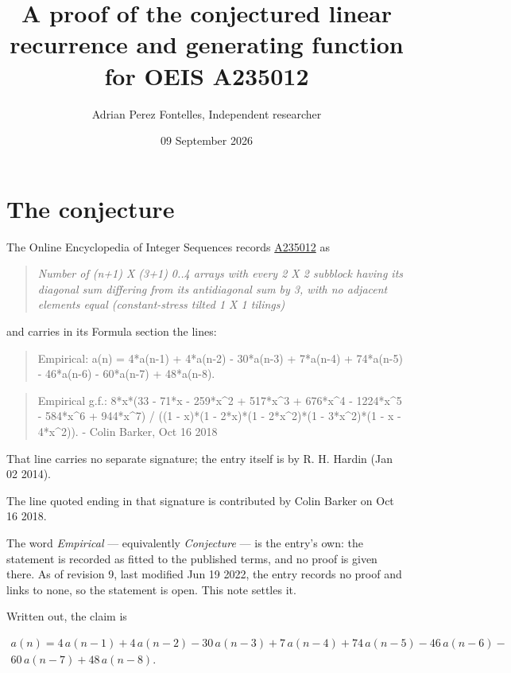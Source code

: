 \documentclass[11pt]{article}
\title{A proof of the conjectured linear recurrence and generating function for OEIS A235012}
\author{Adrian Perez Fontelles, Independent researcher}
\date{09 September 2026}
\theoremstyle{definition}
\begin{document}
\maketitle
\section{The conjecture}

The Online Encyclopedia of Integer Sequences records \href{https://oeis.org/A235012}{A235012} as

\begin{quote}\itshape Number of (n+1) X (3+1) 0..4 arrays with every 2 X 2 subblock having its diagonal sum differing from its antidiagonal sum by 3, with no adjacent elements equal (constant-stress tilted 1 X 1 tilings)\end{quote}

and carries in its Formula section the lines:

\begin{quote}\ttfamily Empirical: a(n) = 4*a(n-1) + 4*a(n-2) - 30*a(n-3) + 7*a(n-4) + 74*a(n-5) - 46*a(n-6) - 60*a(n-7) + 48*a(n-8).\end{quote}

\begin{quote}\ttfamily Empirical g.f.: 8*x*(33 - 71*x - 259*x\textasciicircum{}2 + 517*x\textasciicircum{}3 + 676*x\textasciicircum{}4 - 1224*x\textasciicircum{}5 - 584*x\textasciicircum{}6 + 944*x\textasciicircum{}7) / ((1 - x)*(1 - 2*x)*(1 - 2*x\textasciicircum{}2)*(1 - 3*x\textasciicircum{}2)*(1 - x - 4*x\textasciicircum{}2)). - Colin Barker, Oct 16 2018\end{quote}

That line carries no separate signature; the entry itself is by R. H. Hardin (Jan 02 2014).

The line quoted ending in that signature is contributed by Colin Barker on Oct 16 2018.

The word {\itshape Empirical} --- equivalently {\itshape Conjecture} --- is the entry's own: the statement is recorded as fitted to the published terms, and no proof is given there. As of revision 9, last modified Jun 19 2022, the entry records no proof and links to none, so the statement is open. This note settles it.

Written out, the claim is

\begin{multline*} a(n) = 4\,a(n-1) + 4\,a(n-2) - 30\,a(n-3) + 7\,a(n-4) + 74\,a(n-5) - 46\,a(n-6) - \\ 60\,a(n-7) + 48\,a(n-8). \end{multline*}
\end{document}
